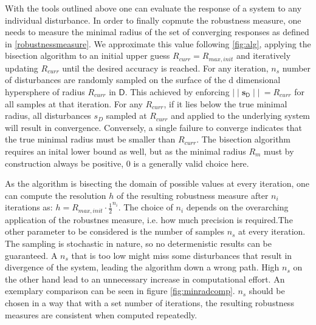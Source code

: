 
    With the tools outlined above one can evaluate the response of a system to any individual disturbance. In order to finally copmute the robustness measure, one needs to measure the minimal radius of the set of converging responses as defined in \ref{robustnessmeasure}. We approximate this value following \ref{fig:alg}, applying the bisection algorithm to an initial upper guess $R_{curr} =  R_{max,init}$ and iteratively updating $R_{curr}$ until the desired accuracy is reached. For any iteration, $n_{s}$ number of disturbances are randomly sampled on the surface of the d dimensional hypersphere of radius $R_{curr}$ in $\mathsf{D}$. This achieved by enforcing $\mid\mid \mathbf{s}_{\mathsf{D}}\mid\mid\ = R_{curr}$ for all samples at that iteration. For any $R_{curr}$, if it lies below the true minimal radius, all disturbances ${s_D}$ sampled at $R_{curr}$ and applied to the underlying system will result in convergence. Conversely, a single failure to converge indicates that the true minimal radius must be smaller than $R_{curr}$. The bisection algorithm requires an inital lower bound as well, but as the minimal radius $R_m$ must by construction always be positive, 0 is a generally valid choice here. 

    As the algorithm is bisecting the domain of possible values at every iteration, one can compute the resolution $h$ of the resulting robustness measure after $n_i$ iterations as: $h = R_{max,init}\cdot\frac{1}{2}^{n_i}$. The choice of $n_i$ depends on the overarching application of the robustnes measure, i.e. how much precision is required.The other parameter to be considered is the number of samples $n_{s}$ at every iteration. The sampling is stochastic in nature, so no determenistic results can be guaranteed. A $n_{s}$ that is too low might miss some disturbances that result in divergence of the system, leading the algorithm down a wrong path. High $n_{s}$ on the other hand lead to an unnecessary increase in computational effort. An exemplary comparison can be seen in figure \ref{fig:minradcomp}. 
    $n_{s}$ should be chosen in a way that with a set number of iterations, the resulting robustness measures are consistent when computed repeatedly. 

